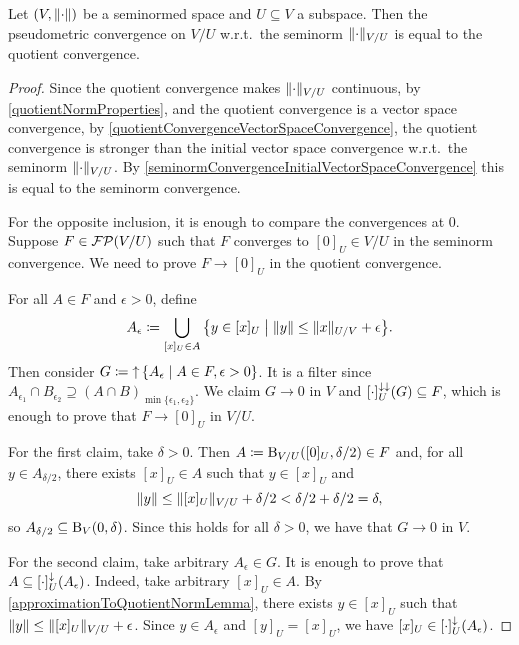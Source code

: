 \begin{proposition} \label{quotientSeminormConvergenceIsQuotientConvergence}
Let $\sSet{V, \norm{\cdot}}$ be a seminormed space and $U\subseteq V$ a subspace. Then the pseudometric convergence on $V/U$ w.r.t.\ the seminorm $\lVert\cdot\rVert_{V/U}$ is equal to the quotient convergence.
\end{proposition}
\begin{proof}
Since the quotient convergence makes $\lVert\cdot\rVert_{V/U}$ continuous, by \ref{quotientNormProperties}, and the quotient convergence is a vector space convergence, by \ref{quotientConvergenceVectorSpaceConvergence}, the quotient convergence is stronger than the initial vector space convergence w.r.t.\ the seminorm $\lVert\cdot\rVert_{V/U}$. By \ref{seminormConvergenceInitialVectorSpaceConvergence} this is equal to the seminorm convergence.

For the opposite inclusion, it is enough to compare the convergences at $0$. Suppose $F \in \operatorname{\mathcal{FP}}(V/U)$ such that $F$ converges to $[0]_U\in V/U$ in the seminorm convergence. We need to prove $F\to [0]_U$ in the quotient convergence.

For all $A\in F$ and $\epsilon > 0$, define
\[ A_\epsilon \defeq \bigcup_{[x]_U\in A}\setbuilder{y\in [x]_U}{\norm{y} \leq \norm{x}_{U/V} + \epsilon}. \]
Then consider $G \defeq \upset\setbuilder{A_\epsilon}{A\in F, \epsilon > 0}$. It is a filter since $A_{\epsilon_1}\cap B_{\epsilon_2} \supseteq (A\cap B)_{\min\{\epsilon_1, \epsilon_2\}}$. We claim $G\to 0$ in $V$ and $[\cdot]_{U}^{\downarrow\downarrow}(G) \subseteq F$, which is enough to prove that $F\to [0]_U$ in $V/U$.

For the first claim, take $\delta >0$. Then $A \coloneqq \operatorname{B}_{V/U}([0]_U, \delta / 2) \in F$ and, for all $y\in A_{\delta / 2}$, there exists $[x]_U\in A$ such that $y\in [x]_U$ and
\[ \lVert y\rVert \leq \lVert[x]_U\rVert_{V/U} + \delta / 2 < \delta / 2 + \delta / 2 = \delta, \]
so $A_{\delta / 2} \subseteq \operatorname{B}_V(0, \delta)$. Since this holds for all $\delta > 0$, we have that $G \to 0$ in $V$.

For the second claim, take arbitrary $A_\epsilon \in G$. It is enough to prove that $A\subseteq [\cdot]_{U}^{\downarrow}(A_\epsilon)$. Indeed, take arbitrary $[x]_U \in A$. By \ref{approximationToQuotientNormLemma}, there exists $y\in [x]_U$ such that $\lVert y\rVert \leq \lVert[x]_U\rVert_{V/U} + \epsilon$. Since $y\in A_\epsilon$ and $[y]_U = [x]_U$, we have $[x]_U \in [\cdot]_{U}^{\downarrow}(A_\epsilon)$.
\end{proof}

